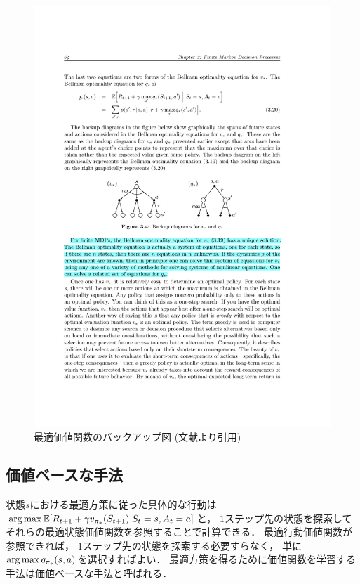 \begin{figure}[h]
  \centering
  \includegraphics[width=\linewidth{}]{figures/backup.pdf}
  \caption{最適価値関数のバックアップ図 (文献\cite{Sutton1998}より引用) \label{fig:backup}}
\end{figure}

\subsection{価値ベースな手法}
状態$s$における最適方策に従った具体的な行動は$\operatorname*{arg\,max} \mathbb{E}[R_{t+1} + \gamma v_{\pi_*}(S_{t+1}) | S_t=s, A_t=a]$と， $1$ステップ先の状態を探索してそれらの最適状態価値関数を参照することで計算できる．
最適行動価値関数が参照できれば， $1$ステップ先の状態を探索する必要すらなく， 単に$\operatorname*{arg\,max} q_{\pi_*}(s, a)$を選択すればよい．
最適方策を得るために価値関数を学習する手法は価値ベースな手法と呼ばれる．

